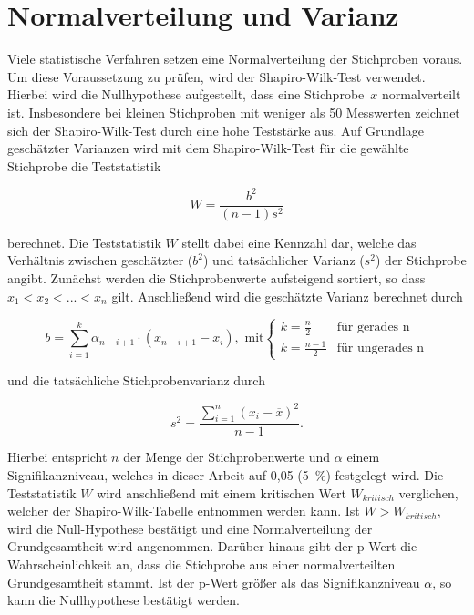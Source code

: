 \section{Normalverteilung und Varianz}

Viele statistische Verfahren setzen eine Normalverteilung der Stichproben voraus. Um diese Voraussetzung zu prüfen, wird der Shapiro-Wilk-Test verwendet. Hierbei wird die Nullhypothese aufgestellt, dass eine Stichprobe~$x$ normalverteilt ist. Insbesondere bei kleinen Stichproben mit weniger als 50 Messwerten zeichnet sich der Shapiro-Wilk-Test durch eine hohe Teststärke aus. Auf Grundlage geschätzter Varianzen wird mit dem Shapiro-Wilk-Test für die gewählte Stichprobe die Teststatistik

\begin{equation}
W =  \frac{b^2}{(n - 1)s^2}
	\label{eq:shapiro}
\end{equation}

berechnet. Die Teststatistik $W$ stellt dabei eine Kennzahl dar, welche das Verhältnis zwischen geschätzter ($b^2$) und tatsächlicher Varianz ($s^2$) der Stichprobe angibt. Zunächst werden die Stichprobenwerte aufsteigend sortiert, so dass $x_1 < x_2 < ... < x_n$ gilt. Anschließend wird die geschätzte Varianz berechnet durch

\begin{equation}
b =  \sum \limits_{i=1}^k \alpha_{n-i+1} \cdot (x_{n-i+1} - x_i), \text{ mit} \begin{cases}
     k = \frac{n}{2} & \text{für gerades n}\\
     k = \frac{n-1}{2} & \text{für ungerades n}
   \end{cases}
	\label{eq:var1}
\end{equation}

und die tatsächliche Stichprobenvarianz durch 

\begin{equation}
s^2 = \frac{\sum \limits_{i=1}^n (x_i - \overline{x})^2}{n - 1}.
	\label{eq:var1}
\end{equation}

Hierbei entspricht $n$ der Menge der Stichprobenwerte und $\alpha$ einem Signifikanzniveau, welches in dieser Arbeit auf 0,05 (5~\%) festgelegt wird. Die Teststatistik $W$ wird anschließend mit einem kritischen Wert $W_{kritisch}$ verglichen, welcher der Shapiro-Wilk-Tabelle entnommen werden kann. Ist $W > W_{kritisch}$, wird die Null-Hypothese bestätigt und eine Normalverteilung der Grundgesamtheit wird angenommen. Darüber hinaus gibt der p-Wert die Wahrscheinlichkeit an, dass die Stichprobe aus einer normalverteilten Grundgesamtheit stammt. Ist der p-Wert größer als das Signifikanzniveau $\alpha$, so kann die Nullhypothese bestätigt werden. \parencite{frank_einfach_2006, shapiro_analysis_1965}\\

